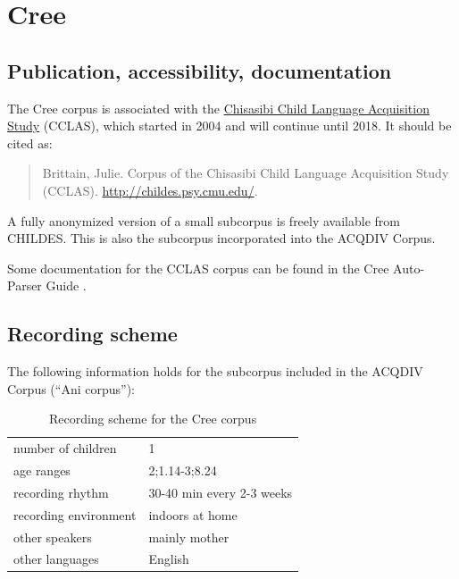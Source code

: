 \documentclass[a4paper, 11pt]{book}
\begin{document}


\section{Cree}
\label{sec:Cree}

\subsection{Publication, accessibility, documentation}

The Cree corpus \citep{Brittain2015a} is associated with the \href{http://www.mun.ca/cclas/}{Chisasibi Child Language Acquisition Study} (CCLAS), which started in 2004 and will continue until 2018. It should be cited as: 

\begin{quote}
Brittain, Julie. Corpus of the Chisasibi Child Language Acquisition Study (CCLAS). \url{http://childes.psy.cmu.edu/}.
\end{quote}

A fully anonymized version of a small subcorpus is freely available from CHILDES. This is also the subcorpus incorporated into the ACQDIV Corpus. 

Some documentation for the CCLAS corpus can be found in the Cree Auto-Parser Guide \citep{Acton2013a}.

\subsection{Recording scheme}

The following information holds for the subcorpus included in the ACQDIV Corpus (“Ani corpus”): 

\begin{table}[ht]
	\centering
	\begin{tabular}{ll}
		\toprule
		number of children 	& 1 \\
		age ranges 			& 2;1.14-3;8.24 \\
		recording rhythm 	& 30-40 min every 2-3 weeks \\
		recording environment & indoors at home \\
		other speakers		& mainly mother \\
		other languages		& English \\
		\bottomrule
	\end{tabular}
	\caption{Recording scheme for the Cree corpus}
	\label{tab:Cree recording scheme}
\end{table}
\end{document}
